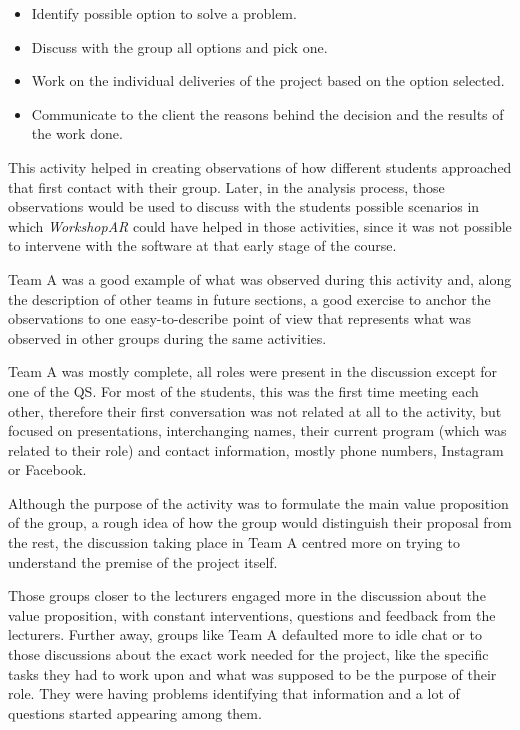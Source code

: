 \begin{itemize}
    \item Identify possible option to solve a problem.
    \item Discuss with the group all options and pick one.
    \item Work on the individual deliveries of the project based on the option selected.
    \item Communicate to the client the reasons behind the decision and the results of the work done.
\end{itemize}

This activity helped in creating observations of how different students approached that first contact with their group. Later, in the analysis process, those observations
would be used to discuss with the students possible scenarios in which \emph{WorkshopAR} could have helped in those activities, since it was not possible to intervene with the
software at that early stage of the course.

Team A was a good example of what was observed during this activity and, along the description of other teams in future sections, a good exercise to anchor the observations
to one easy-to-describe point of view that represents what was observed in other groups during the same activities.

Team A was mostly complete, all roles were present in the discussion except for one of the \ac{QS}. For most of the students, this was the first time meeting each other,
therefore their first conversation was not related at all to the activity, but focused on presentations, interchanging names, their current program (which was related to
their role) and contact information, mostly phone numbers, Instagram or Facebook.

Although the purpose of the activity was to formulate the main value proposition of the group, a rough idea of how the group would distinguish their proposal from the rest,
the discussion taking place in Team A centred more on trying to understand the premise of the project itself.

Those groups closer to the lecturers engaged more in the discussion about the value proposition, with constant interventions, questions and feedback from the lecturers.
Further away, groups like Team A defaulted more to idle chat or to those discussions about the exact work needed for the project, like the specific tasks they had to work
upon and what was supposed to be the purpose of their role. They were having problems identifying that information and a lot of questions started appearing among them.

